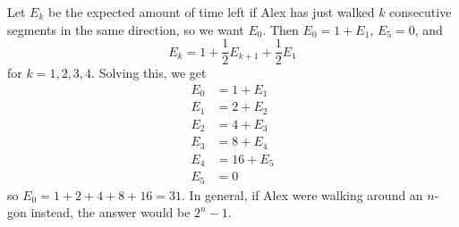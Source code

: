 Let $E_k$ be the expected amount of time left if Alex has just walked $k$ consecutive segments in the same direction, so we want $E_0$. Then $E_0=1+E_1$, $E_5=0$, and \[E_k=1+\frac{1}{2}E_{k+1}+\frac{1}{2}E_1\] for $k=1,2,3,4$. Solving this, we get
	\begin{align*}
		E_0&=1+E_1\\
		E_1&=2+E_2\\
		E_2&=4+E_3\\
		E_3&=8+E_4\\
		E_4&=16+E_5\\
		E_5&=0
	\end{align*}
	so $E_0=1+2+4+8+16=\boxed{31}$. In general, if Alex were walking around an $n$-gon instead, the answer would be $2^n-1$.